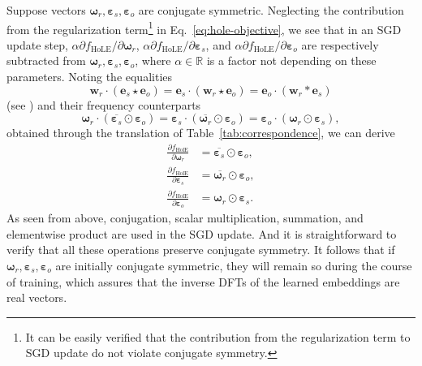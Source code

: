 \documentclass[11pt,a4paper]{article}
\def\mat#1{\boldsymbol{\mathbf{#1}}}
\def\Rset{\mathbb{R}}
\let\cconv*
\let\ccorr\star
\let\hprod\odot
\def\displaypartialgrad#1#2{\frac{\partial #1}{\partial #2}}
\def\partialgrad#1#2{{\partial #1}/{\partial #2}}
\begin{document}
Suppose vectors $\mat{\omega}_r, \mat{\varepsilon}_s, \mat{\varepsilon}_o$ are conjugate symmetric.
Neglecting the contribution from the regularization term\footnote{
  It can be easily verified that the contribution from the regularization term to SGD update do not violate conjugate symmetry.
}
in Eq.~\eqref{eq:hole-objective},
we see that in an SGD update step,
$\alpha \partialgrad{ f_{\text{HoLE}} }{ \mat{\omega}_r      }$,
$\alpha \partialgrad{ f_{\text{HoLE}} }{ \mat{\varepsilon}_s }$, and
$\alpha \partialgrad{ f_{\text{HoLE}} }{ \mat{\varepsilon}_o }$
are respectively subtracted from
$\mat{\omega}_r, \mat{\varepsilon}_s, \mat{\varepsilon}_o$,
where
$\alpha \in \Rset$ is a factor not depending on these parameters.
Noting the equalities
\begin{equation*}
  \mat{w}_r \cdot ( \mat{e}_s \ccorr \mat{e}_o )
  = \mat{e}_s \cdot ( \mat{w}_r \ccorr \mat{e}_o )
  = \mat{e}_o \cdot ( \mat{w}_r \cconv \mat{e}_s )
\end{equation*}
(see \cite[Eq.~(12), p.~1958]{Nickel:16}) and their frequency counterparts
\begin{equation*}
  \mat{\omega}_r        \cdot ( \overline{ \mat{\varepsilon}_s } \hprod \mat{\varepsilon}_o )
  = \mat{\varepsilon}_s \cdot ( \overline{ \mat{\omega}_r      } \hprod \mat{\varepsilon}_o )
  = \mat{\varepsilon}_o \cdot (            \mat{\omega}_r        \hprod \mat{\varepsilon}_s ),
\end{equation*}
obtained through the translation of Table~\ref{tab:correspondence},
we can derive
\begin{align*}
  \displaypartialgrad{ f_{\text{HolE}} }{ \mat{\omega}_r     } & = \overline{ \mat{\varepsilon}_s } \hprod \mat{\varepsilon}_o , \\
  \displaypartialgrad{ f_{\text{HolE}} }{ \mat{\varepsilon}_s} & = \overline{ \mat{\omega}_r      } \hprod \mat{\varepsilon}_o , \\
  \displaypartialgrad{ f_{\text{HolE}} }{ \mat{\varepsilon}_o} & =            \mat{\omega}_r        \hprod \mat{\varepsilon}_s .
\end{align*}
As seen from above, conjugation, scalar multiplication, summation, and elementwise product 
are used in the SGD update.
And it is straightforward to verify that all these operations preserve conjugate symmetry.
It follows that
if $\mat{\omega}_r, \mat{\varepsilon}_s,  \mat{\varepsilon}_o$
are initially conjugate symmetric, they will remain so during the course of training,
which assures that the inverse DFTs of the learned embeddings are real vectors.
\end{document}
